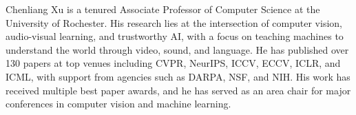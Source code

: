 Chenliang Xu is a tenured Associate Professor of Computer Science at the University of Rochester. His research lies at the intersection of computer vision, audio-visual learning, and trustworthy AI, with a focus on teaching machines to understand the world through video, sound, and language. He has published over 130 papers at top venues including CVPR, NeurIPS, ICCV, ECCV, ICLR, and ICML, with support from agencies such as DARPA, NSF, and NIH. His work has received multiple best paper awards, and he has served as an area chair for major conferences in computer vision and machine learning.
